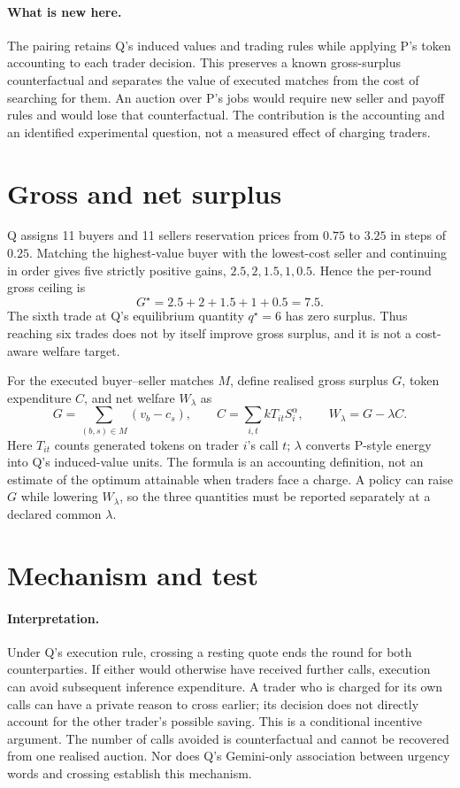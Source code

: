 \documentclass{article}
\begin{document}
\paragraph{What is new here.}
The pairing retains Q's induced values and trading rules while applying P's token accounting to each trader decision. This preserves a known gross-surplus counterfactual and separates the value of executed matches from the cost of searching for them. An auction over P's jobs would require new seller and payoff rules and would lose that counterfactual. The contribution is the accounting and an identified experimental question, not a measured effect of charging traders. %

\section{Gross and net surplus}
Q assigns 11 buyers and 11 sellers reservation prices from \(0.75\) to \(3.25\) in steps of \(0.25\). Matching the highest-value buyer with the lowest-cost seller and continuing in order gives five strictly positive gains, \(2.5,2,1.5,1,0.5\). Hence the per-round gross ceiling is
\[
G^{\star}=2.5+2+1.5+1+0.5=7.5.
\]
The sixth trade at Q's equilibrium quantity \(q^{\star}=6\) has zero surplus. Thus reaching six trades does not by itself improve gross surplus, and it is not a cost-aware welfare target. %

For the executed buyer--seller matches \(M\), define realised gross surplus \(G\), token expenditure \(C\), and net welfare \(W_{\lambda}\) as
\[
G=\sum_{(b,s)\in M}(v_b-c_s),\qquad
C=\sum_{i,t}kT_{it}S_i^{\alpha},\qquad
W_{\lambda}=G-\lambda C.
\]
Here \(T_{it}\) counts generated tokens on trader \(i\)'s call \(t\); \(\lambda\) converts P-style energy into Q's induced-value units. The formula is an accounting definition, not an estimate of the optimum attainable when traders face a charge. A policy can raise \(G\) while lowering \(W_{\lambda}\), so the three quantities must be reported separately at a declared common \(\lambda\). %

\section{Mechanism and test}
\paragraph{Interpretation.}
Under Q's execution rule, crossing a resting quote ends the round for both counterparties. If either would otherwise have received further calls, execution can avoid subsequent inference expenditure. A trader who is charged for its own calls can have a private reason to cross earlier; its decision does not directly account for the other trader's possible saving. This is a conditional incentive argument. The number of calls avoided is counterfactual and cannot be recovered from one realised auction. Nor does Q's Gemini-only association between urgency words and crossing establish this mechanism. %
\end{document}
